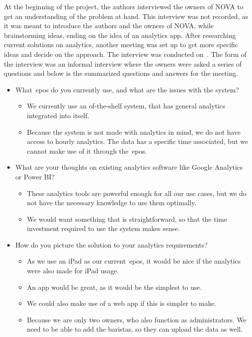 At the beginning of the project, the authors interviewed the owners of NOVA to get an understanding of the problem at
hand.
This interview was not recorded, as it was meant to introduce the authors and the owners of NOVA, while brainstorming
ideas, ending on the idea of an analytics app.
After researching current solutions on analytics, another meeting was set up to get more specific ideas and decide
on the approach.
The interview was conducted on~.
The form of the interview was an informal interview where the owners were asked a series of questions and below is
the summarized questions and answers for the meeting.

\begin{itemize}
    \item What~\acrfull{epos} do you currently use, and what are the issues with the system?
    \begin{itemize}
        \item We currently use an of-the-shelf system, that has general analytics integrated into itself.
        \item Because the system is not made with analytics in mind, we do not have access to hourly analytics.
        The data has a specific time associated, but we cannot make use of it through the~\acrshort{epos}.
    \end{itemize}

    \item What are your thoughts on existing analytics software like Google Analytics or Power BI\@?
    \begin{itemize}
        \item These analytics tools are powerful enough for all our use cases, but we do not have the necessary
        knowledge to use them optimally.
        \item We would want something that is straightforward, so that the time investment
        required to use the system makes sense.
    \end{itemize}

    \item How do you picture the solution to your analytics requirements?
    \begin{itemize}
        \item As we use an iPad as our current~\acrshort{epos}, it would be nice if the analytics were also made for
        iPad usage.
        \item An app would be great, as it would be the simplest to use.
        \item We could also make use of a web app if this is simpler to make.
        \item Because we are only two owners, who also function as administrators.
        We need to be able to add the baristas, so they can upload the data as well.
    \end{itemize}


\end{itemize}
